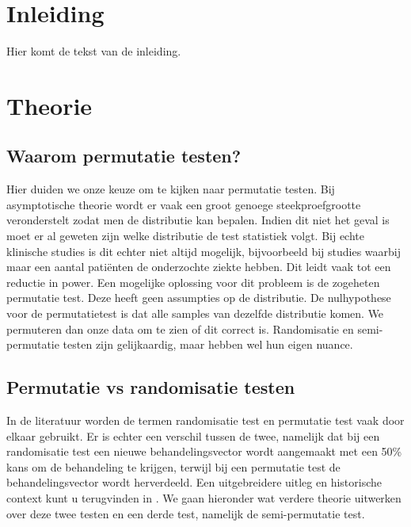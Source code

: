 \documentclass[12pt, a4paper, faculty=we]{ugent-doc}
\begin{document}
\maketitle

\tableofcontents

\newpage
\section{Inleiding}
Hier komt de tekst van de inleiding.

\newpage
\section{Theorie}

\subsection{Waarom permutatie testen?}

\begin{flushleft}
    Hier duiden we onze keuze om te kijken naar permutatie testen. Bij asymptotische theorie wordt er vaak een groot genoege 
    steekproefgrootte veronderstelt zodat men de distributie kan bepalen. Indien dit niet het geval is moet er al geweten zijn welke distributie de test statistiek volgt.
     Bij echte klinische studies is dit echter niet altijd mogelijk, bijvoorbeeld bij studies waarbij maar een aantal patiënten de onderzochte ziekte hebben. 
    Dit leidt vaak tot een reductie in power. Een mogelijke oplossing voor dit probleem is de zogeheten permutatie test.
    Deze heeft geen assumpties op de distributie. De nulhypothese voor de permutatietest is dat alle samples van dezelfde distributie
    komen. We permuteren dan onze data om te zien of dit correct is. Randomisatie en semi-permutatie testen zijn gelijkaardig, maar hebben wel hun eigen nuance.
\end{flushleft}

\subsection{Permutatie vs randomisatie testen}
\begin{flushleft}
    In de literatuur worden de termen randomisatie test en permutatie test vaak door elkaar gebruikt. Er is echter een verschil
tussen de twee, namelijk dat bij een randomisatie test een nieuwe behandelingsvector wordt aangemaakt met een 50\% kans om de behandeling te krijgen,
terwijl bij een permutatie test de behandelingsvector wordt herverdeeld. Een uitgebreidere uitleg en historische context
kunt u terugvinden in \textcite{onghena2018randomization}. We gaan hieronder wat verdere theorie uitwerken over deze twee testen en een derde test, namelijk de semi-permutatie test. 
\end{flushleft}
\end{document}
